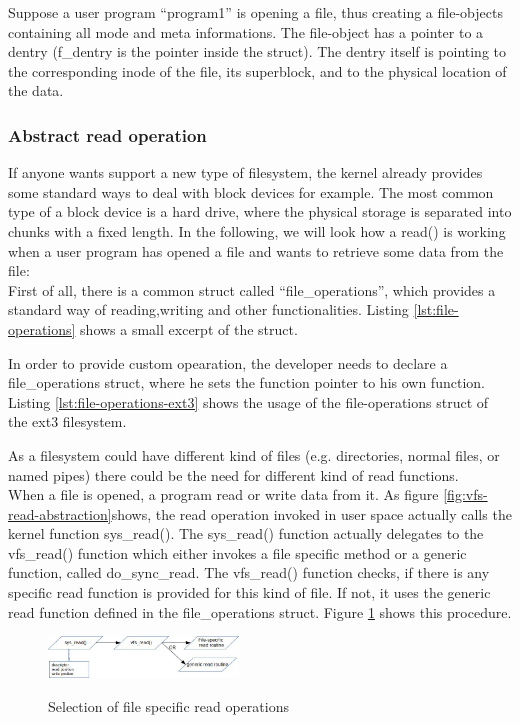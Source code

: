 \documentclass{sig-alternate-05-2015}
\begin{document}
Suppose a user program ``program1'' is opening a file, thus creating a file-objects containing all mode and  meta informations. The file-object has a pointer to a dentry (f\_dentry is the pointer inside the struct). The dentry itself is  pointing to the corresponding inode of the file, its superblock, and to the physical location of the data. 

\subsubsection{Abstract read operation}

If anyone wants support a new  type of filesystem, the kernel already provides some standard ways to deal with block devices for example. The most common type of a block device is a hard drive, where the physical storage is separated into chunks with a fixed length.
In the following, we will look how a read() is working when a user program has opened a file and wants to retrieve some data from the file:\\
First of all, there is a common struct called ``file\_operations'', which provides a standard way of reading,writing and other functionalities. Listing \ref{lst:file-operations} shows a small excerpt of the struct.

In order to provide custom opearation, the developer needs to declare a file\_operations struct, where he sets the function pointer to his own function. Listing \ref{lst:file-operations-ext3} shows the usage of the file-operations struct of the ext3 filesystem. 


 As a filesystem could have different kind of files (e.g. directories, normal files, or named pipes) there could be the need for different kind of read functions.\\
When a file is opened, a program read or write data from it. As figure \ref{fig:vfs-read-abstraction}shows, the read operation invoked in user space actually calls  the kernel function sys\_read(). The sys\_read() function actually delegates to the vfs\_read() function which either invokes a file specific method or a generic function, called do\_sync\_read. 
The vfs\_read() function checks, if there is any specific read function is provided for this kind of file. If not, it uses the generic read function defined in the file\_operations struct.  Figure \ref{fig:generic_read} shows this procedure.
\begin{figure}
\centering
\includegraphics[width= 0.45\textwidth ]{img/generic_read.jpg}
\label{fig:generic_read}
\caption{Selection of file specific read operations}
\end{figure}
\end{document}
